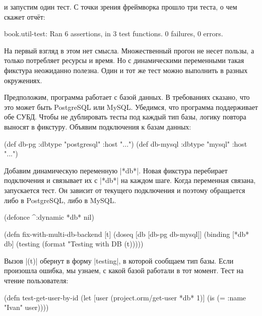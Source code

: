 \noindent
и запустим один тест. С точки зрения фреймворка прошло три теста, о чем скажет
отч\"{е}т:

\begin{english}
  \begin{text}
book.util-test: Ran 6 assertions, in 3 test functions.
0 failures, 0 errors.
  \end{text}
\end{english}

На первый взгляд в этом нет смысла. Множественный прогон не несет пользы, а
только потребляет ресурсы и время. Но с динамическими переменными такая фикстура
неожиданно полезна. Один и тот же тест можно выполнить в разных окружениях.

Предположим, программа работает с базой данных. В требованиях сказано, что это
может быть PostgreSQL или MySQL. Убедимся, что программа поддерживает обе
СУБД. Чтобы не дублировать тесты под каждый тип базы, логику повтора выносят в
фикстуру. Объявим подключения к базам данных:


\begin{english}
  \begin{clojure}
(def db-pg {:dbtype "postgresql" :host "..."})
(def db-mysql {:dbtype "mysql" :host "..."})
  \end{clojure}
\end{english}

Добавим динамическую переменную \spverb|*db*|. Новая фикстура перебирает
подключения и связывает их с \spverb|*db*| на каждом шаге. Когда переменная
связана, запускается тест. Он зависит от текущего подключения и поэтому
обращается либо в PostgreSQL, либо в MySQL.

\begin{english}
  \begin{clojure}
(defonce ^:dynamic *db* nil)

(defn fix-with-multi-db-backend [t]
  (doseq [db [db-pg db-mysql]]
    (binding [*db* db]
      (testing (format "Testing with DB %
        (t)))))
  \end{clojure}
\end{english}

Вызов \spverb|(t)| обернут в форму \spverb|testing|, в которой сообщаем тип
базы. Если произошла ошибка, мы узнаем, с какой базой работали в тот
момент. Тест на чтение пользователя:

\begin{english}
  \begin{clojure}
(defn test-get-user-by-id
  (let [user (project.orm/get-user *db* 1)]
    (is (= {:name "Ivan"} user))))
  \end{clojure}
\end{english}

